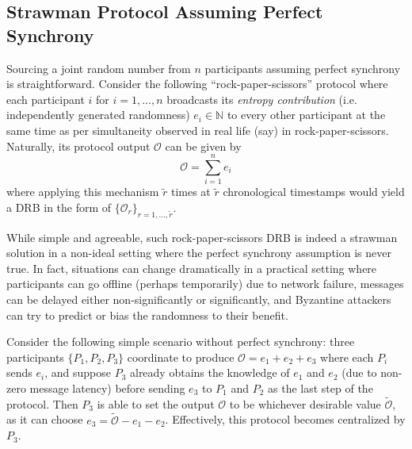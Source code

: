 \documentclass[letterpaper,twocolumn,10pt]{article}
\theoremstyle{definition}
\theoremstyle{remark}
\begin{document}
\subsection{Strawman Protocol Assuming Perfect Synchrony}
Sourcing a joint random number from $n$ participants assuming perfect synchrony is straightforward. Consider the following ``rock-paper-scissors'' protocol where each participant $i$ for $i = 1, ..., n$ broadcasts its \textit{entropy contribution} (i.e. independently generated randomness) $e_i \in \mathbb{N}$ to every other participant at the same time as per simultaneity observed in real life (say) in rock-paper-scissors. Naturally, its protocol output $\mathcal{O}$ can be given by
\[
\mathcal{O} = \sum_{i = 1}^n e_i
\]
where applying this mechanism $\tilde{r}$ times at $\tilde{r}$ chronological timestamps would yield a DRB in the form of $\{\mathcal{O}_r\}_{r = 1, ..., \tilde{r}}$.

While simple and agreeable, such rock-paper-scissors DRB is indeed a strawman solution in a non-ideal setting where the perfect synchrony assumption is never true. In fact, situations can change dramatically in a practical setting where participants can go offline (perhaps temporarily) due to network failure, messages can be delayed either non-significantly or significantly, and Byzantine attackers can try to predict or bias the randomness to their benefit.

Consider the following simple scenario without perfect synchrony: three participants $\{P_1, P_2, P_3\}$ coordinate to produce $\mathcal{O} = e_1 + e_2 + e_3$ where each $P_i$ sends $e_i$, and suppose $P_3$ already obtains the knowledge of $e_1$ and $e_2$ (due to non-zero message latency) before sending $e_3$ to $P_1$ and $P_2$ as the last step of the protocol. Then $P_3$ is able to set the output $\mathcal{O}$ to be whichever desirable value $\tilde{\mathcal{O}}$, as it can choose $e_3 = \tilde{\mathcal{O}} - e_1 - e_2$. Effectively, this protocol becomes centralized by $P_3$.
\end{document}
